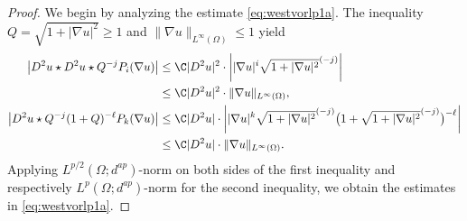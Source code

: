 \documentclass[12pt,a4paper,twoside]{article}
\newcommand {\cb}[1] {\tikz[baseline=(char.base)]{
            \node[shape=circle,draw,inner sep=2pt] (char) {\itshape{\textbf{#1}}};}}
\begin{document}
\begin{proof}
\noindent\cb 1 We begin by analyzing the estimate \eqref{eq:westvorlp1a}.
The inequality $Q=\sqrt{1+|\nabla u|^2}\ge 1$ and $\|\nabla u\|_{L^\infty({\Omega})}\le1$ yield
 \begin{align*}
 \begin{aligned}
    \big|D^2 u \star D^2  u \star  Q^{-j}P_{i}(\nabla u)  \big| &\le
    \C | D^2 u |^2 \cdot \left|{|\nabla u|^{i}}{\sqrt{1+|\nabla u|^2}^{(-j)}}\right|
   \\
    &
    \le  \C | D^2 u |^2 \cdot \|\nabla u\|_{L^\infty(\Omega)},\\
 \big|D^2 u \star  Q^{-j}(1+Q)^{-\ell}P_{k}(\nabla u)   \big|
     &\le \C | D^2 u | \cdot \left|{|\nabla u|^{k}}{\sqrt{1+|\nabla u|^2}^{(-j)}}\big(1+ {\sqrt{1+|\nabla u|^2}^{(-j)}} \big)^{-\ell}\right|\\
   & \le \C
         |D^2 u | \cdot \|\nabla u  \|_{L^\infty({\Omega})} .
\end{aligned} 
    \end{align*}
Applying $L^{p/2}(\Omega;d^{ap})$-norm on both sides of the first inequality and respectively $L^{p}(\Omega;d^{ap})$-norm for the second inequality, we obtain the estimates in \eqref{eq:westvorlp1a}.  


\end{proof}
\end{document}
